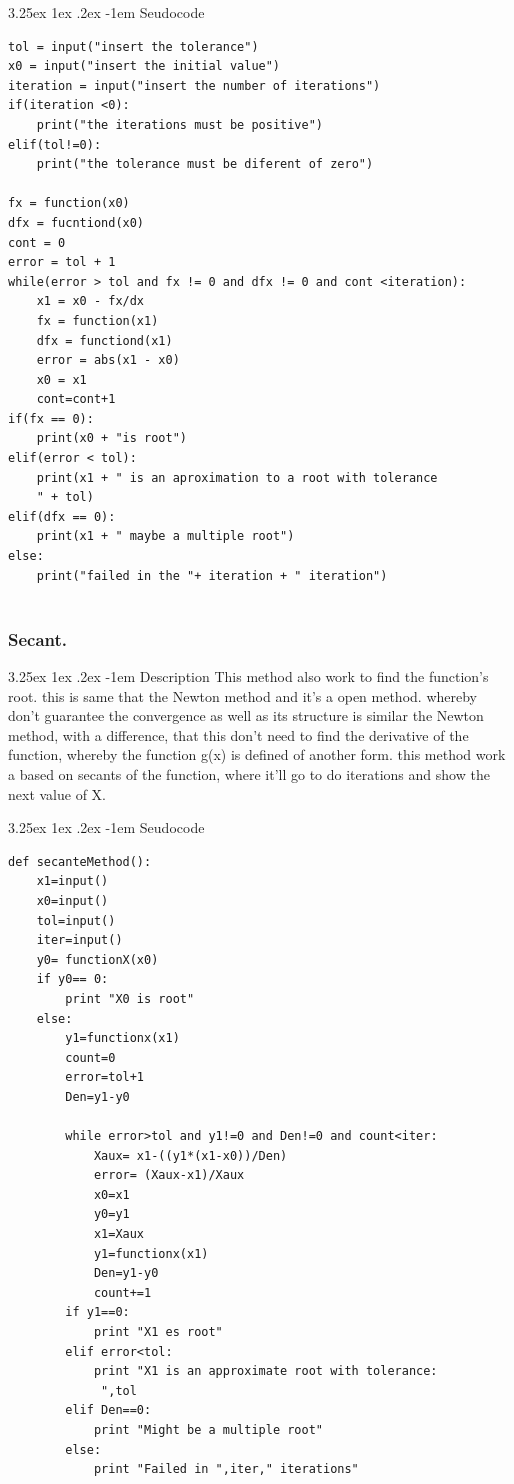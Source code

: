 \documentclass{article}
\makeatletter
\renewcommand\paragraph{\@startsection{paragraph}{5}{\z@}%
  {3.25ex \@plus1ex \@minus.2ex}%
  {-1em}%
  {\normalfont\normalsize\bfseries}}
\makeatother
\begin{document}
\paragraph{Seudocode}
\hfill \break
\begin{lstlisting}
tol = input("insert the tolerance")
x0 = input("insert the initial value")
iteration = input("insert the number of iterations")
if(iteration <0):
	print("the iterations must be positive")
elif(tol!=0):
	print("the tolerance must be diferent of zero")

fx = function(x0)
dfx = fucntiond(x0)
cont = 0
error = tol + 1
while(error > tol and fx != 0 and dfx != 0 and cont <iteration):
 	x1 = x0 - fx/dx
 	fx = function(x1)
 	dfx = functiond(x1)
	error = abs(x1 - x0)
	x0 = x1
	cont=cont+1
if(fx == 0):
	print(x0 + "is root")
elif(error < tol):
	print(x1 + " is an aproximation to a root with tolerance 
	" + tol)
elif(dfx == 0):
	print(x1 + " maybe a multiple root")
else:
	print("failed in the "+ iteration + " iteration")


\end{lstlisting}
\subsubsection{Secant.}

\paragraph{Description}
\hfill \break
This method also work to find the function’s root. this is same that the Newton method and it’s a open method. whereby don’t guarantee the convergence as well as its structure is similar the Newton method, with a difference, that this don’t need to find the derivative of the function, whereby the function g(x) is defined of another form.  
this method work a based on secants of the function, where it’ll go to do iterations and show the next value of X.


\paragraph{Seudocode}
\hfill \break
\begin{lstlisting}
def secanteMethod():
    x1=input()
    x0=input()
    tol=input()
    iter=input()
    y0= functionX(x0)
    if y0== 0:
        print "X0 is root"
    else:
        y1=functionx(x1)
        count=0
        error=tol+1
        Den=y1-y0

        while error>tol and y1!=0 and Den!=0 and count<iter:
            Xaux= x1-((y1*(x1-x0))/Den)
            error= (Xaux-x1)/Xaux
            x0=x1
            y0=y1
            x1=Xaux
            y1=functionx(x1)
            Den=y1-y0
            count+=1
        if y1==0:
            print "X1 es root"
        elif error<tol:
            print "X1 is an approximate root with tolerance:
             ",tol
        elif Den==0:
            print "Might be a multiple root"
        else:
            print "Failed in ",iter," iterations"


\end{lstlisting}
\end{document}
